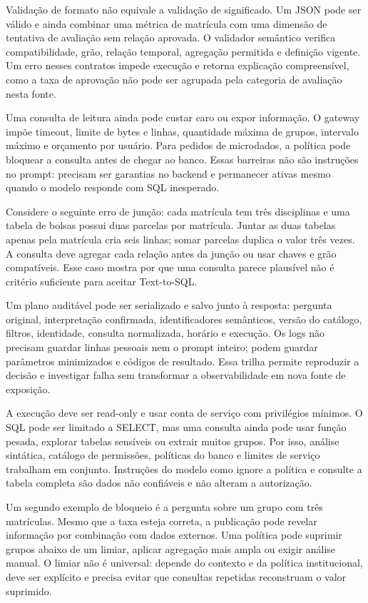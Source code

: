Validação de formato não equivale a validação de significado. Um JSON pode ser válido e ainda combinar uma métrica de matrícula com uma dimensão de tentativa de avaliação sem relação aprovada. O validador semântico verifica compatibilidade, grão, relação temporal, agregação permitida e definição vigente. Um erro nesses contratos impede execução e retorna explicação compreensível, como a taxa de aprovação não pode ser agrupada pela categoria de avaliação nesta fonte.

Uma consulta de leitura ainda pode custar caro ou expor informação. O gateway impõe timeout, limite de bytes e linhas, quantidade máxima de grupos, intervalo máximo e orçamento por usuário. Para pedidos de microdados, a política pode bloquear a consulta antes de chegar ao banco. Essas barreiras não são instruções no prompt: precisam ser garantias no backend e permanecer ativas mesmo quando o modelo responde com SQL inesperado.

Considere o seguinte erro de junção: cada matrícula tem três disciplinas e uma tabela de bolsas possui duas parcelas por matrícula. Juntar as duas tabelas apenas pela matrícula cria seis linhas; somar parcelas duplica o valor três vezes. A consulta deve agregar cada relação antes da junção ou usar chaves e grão compatíveis. Esse caso mostra por que uma consulta parece plausível não é critério suficiente para aceitar Text-to-SQL.

Um plano auditável pode ser serializado e salvo junto à resposta: pergunta original, interpretação confirmada, identificadores semânticos, versão do catálogo, filtros, identidade, consulta normalizada, horário e execução. Os logs não precisam guardar linhas pessoais nem o prompt inteiro; podem guardar parâmetros minimizados e códigos de resultado. Essa trilha permite reproduzir a decisão e investigar falha sem transformar a observabilidade em nova fonte de exposição.

A execução deve ser read-only e usar conta de serviço com privilégios mínimos. O SQL pode ser limitado a SELECT, mas uma consulta ainda pode usar função pesada, explorar tabelas sensíveis ou extrair muitos grupos. Por isso, análise sintática, catálogo de permissões, políticas do banco e limites de serviço trabalham em conjunto. Instruções do modelo como ignore a política e consulte a tabela completa são dados não confiáveis e não alteram a autorização.

Um segundo exemplo de bloqueio é a pergunta sobre um grupo com três matrículas. Mesmo que a taxa esteja correta, a publicação pode revelar informação por combinação com dados externos. Uma política pode suprimir grupos abaixo de um limiar, aplicar agregação mais ampla ou exigir análise manual. O limiar não é universal: depende do contexto e da política institucional, deve ser explícito e precisa evitar que consultas repetidas reconstruam o valor suprimido.

